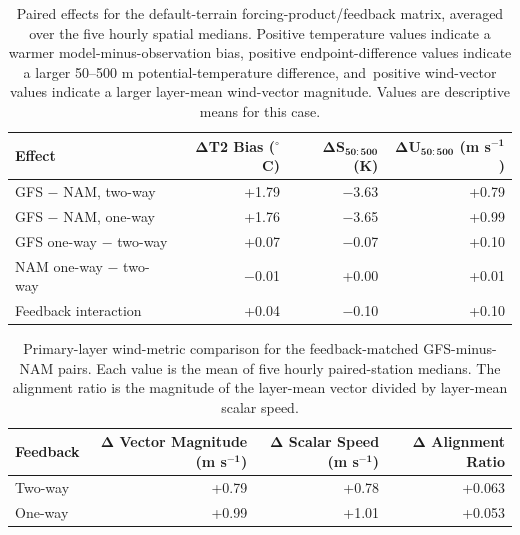 \documentclass[air,article,accept,moreauthors]{Definitions/mdpi}
\begin{document}
\vspace{-9pt}
\begin{table}[H]
\caption{Paired effects for the default-terrain forcing-product/feedback matrix, averaged over the five hourly spatial medians.
Positive temperature values indicate a warmer model-minus-observation bias, positive endpoint-difference values indicate a larger 50--500 m potential-temperature difference, and~positive wind-vector values indicate a larger layer-mean wind-vector magnitude.
Values are descriptive means for this case.}
\label{tab:v3-effects}
\centering
\small
\begin{tabularx}{0.92\textwidth}{lRRR}
\toprule
\textbf{Effect} & \textbf{$\boldsymbol{\Delta}$T2 Bias ($\boldsymbol{^{\circ}}$C)} & \textbf{$\boldsymbol{\Delta S_{50:500}}$ (K)} & \textbf{$\boldsymbol{\Delta U_{50:500}}$ (m s$\boldsymbol{^{-1}}$)} \\
\midrule
GFS $-$ NAM, two-way & +1.79 & $-$3.63 & +0.79 \\
GFS $-$ NAM, one-way & +1.76 & $-$3.65 & +0.99 \\
GFS one-way $-$ two-way & +0.07 & $-$0.07 & +0.10 \\
NAM one-way $-$ two-way & $-$0.01 & +0.00 & +0.01 \\
Feedback interaction & +0.04 & $-$0.10 & +0.10 \\
\bottomrule
\end{tabularx}
\end{table}

\vspace{-9pt}
\begin{table}[H]
\caption{Primary-layer wind-metric comparison for the feedback-matched GFS-minus-NAM pairs.
Each value is the mean of five hourly paired-station medians.
The alignment ratio is the magnitude of the layer-mean vector divided by layer-mean scalar speed.}
\label{tab:v3-wind-cancellation}
\small
\begin{tabularx}{\textwidth}{Lrrr}
\toprule
\textbf{Feedback} & \textbf{$\boldsymbol{\Delta}$ Vector Magnitude (m s$\boldsymbol{^{-1}}$)} & \textbf{$\boldsymbol{\Delta}$ Scalar Speed (m s$\boldsymbol{^{-1}}$)} & \textbf{$\boldsymbol{\Delta}$ Alignment Ratio} \\
\midrule
Two-way & +0.79 & +0.78 & +0.063 \\
One-way & +0.99 & +1.01 & +0.053 \\
\bottomrule
\end{tabularx}
\end{table}
\vspace{-9pt}
\end{document}
